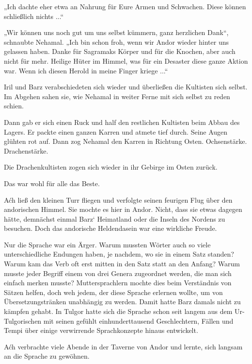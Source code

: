 „Ich dachte eher etwa an Nahrung für Eure Armen und Schwachen. Diese können schließlich nichts ...“

„Wir können uns noch gut um uns selbst kümmern, ganz herzlichen Dank“, schnaubte Nehamal. „Ich bin schon froh, wenn wir Andor wieder hinter uns gelassen haben. Danke für Sagramaks Körper und für die Knochen, aber auch nicht für mehr. Heilige Hüter im Himmel, was für ein Desaster diese ganze Aktion war. Wenn ich diesen Herold in meine Finger kriege ...“

Iril und Barz verabschiedeten sich wieder und überließen die Kultisten sich selbst. Im Abgehen sahen sie, wie Nehamal in weiter Ferne mit sich selbst zu reden schien.

Dann gab er sich einen Ruck und half den restlichen Kultisten beim Abbau des Lagers. Er packte einen ganzen Karren und atmete tief durch. Seine Augen glühten rot auf. Dann zog Nehamal den Karren in Richtung Osten. Ochsenstärke. Drachenstärke.

Die Drachenkultisten zogen sich wieder in ihr Gebirge im Osten zurück.

Das war wohl für alle das Beste.



\trennzeichen



Aćh ließ den kleinen Turr fliegen und verfolgte seinen feurigen Flug über den andorischen Himmel. Sie mochte es hier in Andor. Nicht, dass sie etwas dagegen hätte, demnächst einmal Barz‘ Heimatland oder die Inseln des Nordens zu besuchen. Doch das andorische Heldendasein war eine wirkliche Freude.

Nur die Sprache war ein Ärger. Warum mussten Wörter auch so viele unterschiedliche Endungen haben, je nachdem, wo sie in einem Satz standen? Warum kam das Verb oft erst mitten in den Satz statt an den Anfang? Warum musste jeder Begriff einem von drei Genera zugeordnet werden, die man sich einfach merken musste? Muttersprachlern mochte dies beim Verständnis von Sätzen helfen, doch weh jedem, der diese Sprache erlernen wollte, um von Übersetzungstränken unabhängig zu werden. Damit hatte Barz damals nicht zu kämpfen gehabt. In Tulgor hatte sich die Sprache schon seit langem aus dem Ur-Tulgorischen mit seinen gefühlt einhunderttausend Geschlechtern, Fällen und Tempi über einige verwirrende Sprachkonzepte hinaus entwickelt.

Aćh verbrachte viele Abende in der Taverne von Andor und lernte, sich langsam an die Sprache zu gewöhnen.

